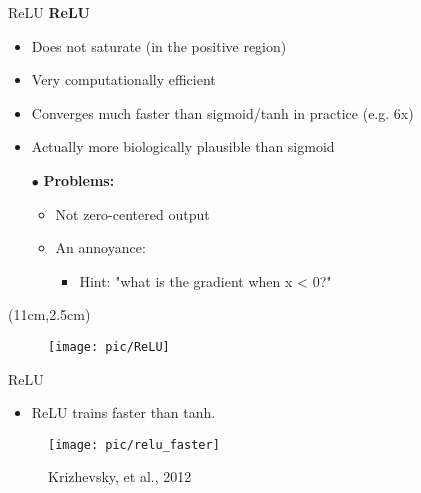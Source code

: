 \documentclass[serif, aspectratio=169]{beamer}
\begin{document}
\begin{frame}{ReLU}
	\textbf{ReLU}
	\begin{itemize}
		\item Does not saturate (in the positive region)
		\item Very computationally efficient
		\item Converges much faster than sigmoid/tanh \newline in practice (e.g. 6x)
		\item Actually more biologically plausible than sigmoid
		\item[{$\bullet$}] \textbf{Problems:}
		\begin{itemize}
			\item Not zero-centered output
			\item An annoyance:
			\begin{itemize}
				\item Hint: "what is the gradient when x < 0?"
			\end{itemize}
		\end{itemize}
	\end{itemize}
	\begin{textblock*}{5cm}(11cm,2.5cm) %
		\begin{figure}[htbp]
			\begin{center}
				\texttt{[image: pic/ReLU]}
			\end{center}
		\end{figure}
	\end{textblock*}
\end{frame}

\begin{frame}{ReLU}
	\begin{itemize}
		\item ReLU trains faster than tanh.
	\end{itemize}
	\begin{figure}[htbp]
		\begin{center}
			\texttt{[image: pic/relu\_faster]}
			\caption*{\scriptsize Krizhevsky, et al., 2012}
		\end{center}
	\end{figure}
\end{frame}
\end{document}

